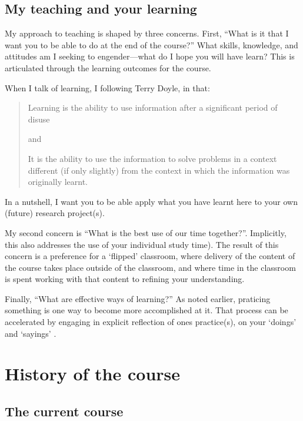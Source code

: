 \documentclass[]{book}
\theoremstyle{definition}
\theoremstyle{definition}
\theoremstyle{definition}
\theoremstyle{remark}
\begin{document}
\hypertarget{my-teaching-and-your-learning}{%
\section{My teaching and your
learning}\label{my-teaching-and-your-learning}}

My approach to teaching is shaped by three concerns. First, ``What is it
that I want you to be able to do at the end of the course?'' What
skills, knowledge, and attitudes am I seeking to engender---what do I
hope you will have learn? This is articulated through the learning
outcomes for the course.

When I talk of learning, I following Terry Doyle, in that:

\begin{quote}
Learning is the ability to use information after a significant period of
disuse

and

It is the ability to use the information to solve problems in a context
different (if only slightly) from the context in which the information
was originally learnt.
\end{quote}

In a nutshell, I want you to be able apply what you have learnt here to
your own (future) research project(s).

My second concern is ``What is the best use of our time together?''.
Implicitly, this also addresses the use of your individual study time).
The result of this concern is a preference for a `flipped' classroom,
where delivery of the content of the course takes place outside of the
classroom, and where time in the classroom is spent working with that
content to refining your understanding.

Finally, ``What are effective ways of learning?'' As noted earlier,
praticing something is one way to become more accomplished at it. That
process can be accelerated by engaging in explicit reflection of ones
practice(s), on your `doings' and `sayings'
\autocite{schatzki_2001_practiceturncontemporary}.

\hypertarget{history}{%
\chapter{History of the course}\label{history}}

\hypertarget{the-current-course}{%
\section{The current course}\label{the-current-course}}
\end{document}
